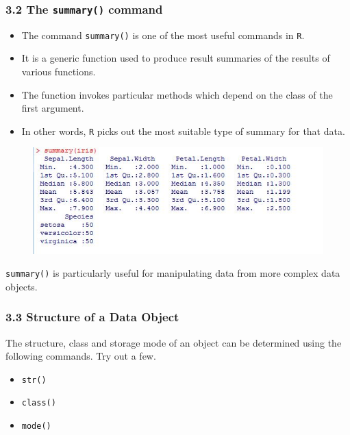 \documentclass{beamer}
\begin{document}
 	\begin{frame}
 		\frametitle{3.2 The \texttt{summary()} command}
 		\begin{itemize}
 			\item The command \texttt{summary()} is one of the most useful commands in \texttt{R}. 
 			\item It is a generic function used
 			to produce result summaries of the results of various functions. 
 			\item The function invokes particular
 			methods which depend on the class of the first argument. 
 			\item In other words, \texttt{R} picks out the most
 			suitable type of summary for that data.
 		\end{itemize}
 	\end{frame}
 	\begin{frame}
 		
 		
 		\begin{figure}
 			\centering
 			\includegraphics[width=0.99\linewidth]{images/irissummary}
 			
 		\end{figure}
 		\texttt{summary()} is particularly useful for manipulating data from more complex data objects.
 		
 	\end{frame}
 	\begin{frame}
 		
 		\frametitle{3.3 Structure of a Data Object}
 		\large
 		The structure, class and storage mode of an object can be determined using the following
 		commands. Try out a few.
 		\begin{itemize}
 			\item  \texttt{str()}
 			\item  \texttt{class()}
 			\item  \texttt{mode()}
 		\end{itemize}
 		
 		
 	\end{frame}
\end{document}
